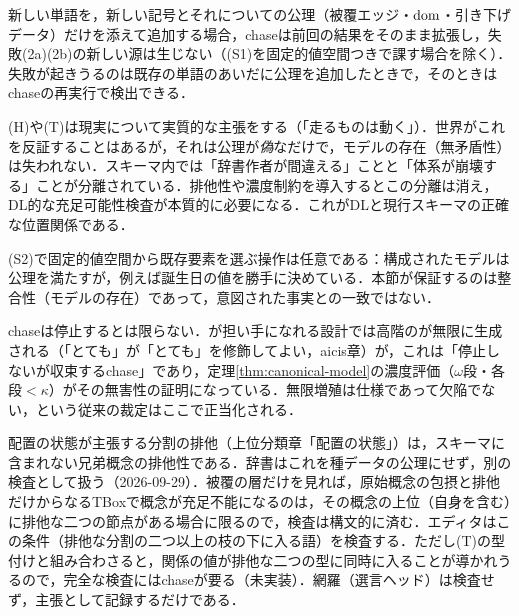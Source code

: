 \documentclass[../../main-detail.tex]{subfiles}
\begin{document}
\begin{remark}[単語の追加は常に安全である]
    新しい単語を，新しい記号とそれについての公理（被覆エッジ・$\mathop{\mathrm{dom}}\nolimits$・引き下げデータ）だけを添えて追加する場合，chaseは前回の結果をそのまま拡張し，失敗(2a)(2b)の新しい源は生じない（(S1)を固定的値空間つきで課す場合を除く）．失敗が起きうるのは既存の単語のあいだに公理を追加したときで，そのときはchaseの再実行で検出できる．
\end{remark}
\begin{remark}[偽と矛盾の分離]
    (H)や(T)は現実について実質的な主張をする（「走るものは動く」）．世界がこれを反証することはあるが，それは公理が\emph{偽}なだけで，モデルの存在（無矛盾性）は失われない．スキーマ内では「辞書作者が間違える」ことと「体系が崩壊する」ことが分離されている．排他性や濃度制約を導入するとこの分離は消え，DL的な充足可能性検査が本質的に必要になる\cite{dl-handbook}．これがDLと現行スキーマの正確な位置関係である．
\end{remark}
\begin{remark}[最小モデルは真理を保証しない]
    (S2)で固定的値空間から既存要素を選ぶ操作は任意である：構成されたモデルは公理を満たすが，例えば誕生日の値を勝手に決めている．本節が保証するのは整合性（モデルの存在）であって，意図された事実との一致ではない．
\end{remark}
\begin{remark}
    chaseは停止するとは限らない．が担い手になれる設計では高階のが無限に生成される（「とても」が「とても」を修飾してよい，aicis章）が，これは「停止しないが収束するchase」であり，定理\ref{thm:canonical-model}の濃度評価（$\omega$段・各段$<\kappa$）がその無害性の証明になっている．無限増殖は仕様であって欠陥でない，という従来の裁定はここで正当化される．
\end{remark}

\begin{remark}[分割の排他はスキーマの外で検査する]
    配置の状態が主張する分割の排他（上位分類章「配置の状態」）は，スキーマに含まれない兄弟概念の排他性である．辞書はこれを種データの公理にせず，別の検査として扱う（2026-09-29）．被覆の層だけを見れば，原始概念の包摂と排他だけからなるTBoxで概念が充足不能になるのは，その概念の上位（自身を含む）に排他な二つの節点がある場合に限るので，検査は構文的に済む．エディタはこの条件（排他な分割の二つ以上の枝の下に入る語）を検査する．ただし(T)の型付けと組み合わさると，関係の値が排他な二つの型に同時に入ることが導かれうるので，完全な検査にはchaseが要る（未実装）．網羅（選言ヘッド）は検査せず，主張として記録するだけである．
\end{remark}
\end{document}
